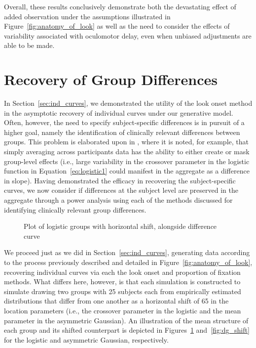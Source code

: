 Overall, these results conclusively demonstrate both the devastating effect of added observation under the assumptions illustrated in Figure~\ref{fig:anatomy_of_look} as well as the need to consider the effects of variability associated with oculomotor delay, even when unbiased adjustments are able to be made. 


\section{Recovery of Group Differences}



In Section~\ref{sec:ind_curves}, we demonstrated the utility of the look onset method in the asymptotic recovery of individual curves under our generative model. Often, however, the need to specify subject-specific differences is in pursuit of a higher goal, namely the identification of clinically relevant differences between groups. This problem is elaborated upon in \citet{mcmurray2010individual}, where it is noted, for example, that simply averaging across participants data has the ability to either create or mask group-level effects (i.e., large variability in the crossover parameter in the logistic function in Equation~\ref{eq:logistic1} could manifest in the aggregate as a difference in slope). Having demonstrated the efficacy in recovering the subject-specific curves, we now consider if differences at the subject level are preserved in the aggregate through a power analysis using each of the methods discussed for identifying clinically relevant group differences. 

\begin{figure}[H]
    \centering
    \caption{Plot of logistic groups with horizontal shift, alongside difference curve}
\label{fig:logistic_shift}
\end{figure}



We proceed just as we did in Section~\ref{sec:ind_curves}, generating data according to the process previously described and detailed in Figure~\ref{fig:anatomy_of_look}, recovering individual curves via each the look onset and proportion of fixation methods. What differs here, however, is that each simulation is constructed to simulate drawing two groups with 25 subjects each from empirically estimated distributions that differ from one another as a horizontal shift of 65 in the location parameters (i.e., the crossover parameter in the logistic and the mean parameter in the asymmetric Gaussian). An illustration of the mean structure of each group and its shifted counterpart is depicted in Figures~\ref{fig:logistic_shift} and~\ref{fig:dg_shift} for the logistic and asymmetric Gaussian, respectively.

